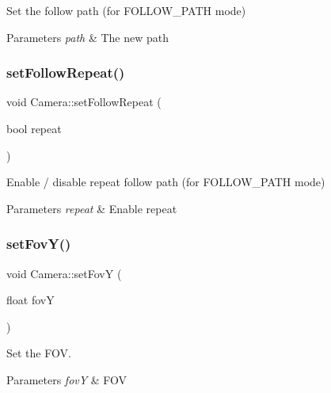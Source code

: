 Set the follow path (for F\+O\+L\+L\+O\+W\+\_\+\+P\+A\+TH mode) 


\begin{DoxyParams}{Parameters}
{\em path} & The new path \\
\hline
\end{DoxyParams}
\mbox{\label{class_camera_a9f190ab490492b811ccc3603b68fe70a}} 
\subsubsection{\texorpdfstring{set\+Follow\+Repeat()}{setFollowRepeat()}}
{\footnotesize\ttfamily void Camera\+::set\+Follow\+Repeat (\begin{DoxyParamCaption}\item[{bool}]{repeat }\end{DoxyParamCaption})}



Enable / disable repeat follow path (for F\+O\+L\+L\+O\+W\+\_\+\+P\+A\+TH mode) 


\begin{DoxyParams}{Parameters}
{\em repeat} & Enable repeat \\
\hline
\end{DoxyParams}
\mbox{\label{class_camera_a3138aa2e40815013739ddb71502ca608}} 
\subsubsection{\texorpdfstring{set\+Fov\+Y()}{setFovY()}}
{\footnotesize\ttfamily void Camera\+::set\+FovY (\begin{DoxyParamCaption}\item[{float}]{fovY }\end{DoxyParamCaption})}



Set the F\+OV. 


\begin{DoxyParams}{Parameters}
{\em fovY} & F\+OV \\
\hline
\end{DoxyParams}
\mbox{\label{class_camera_a90617e4799a43f0b74ede1d6caca958e}} 
